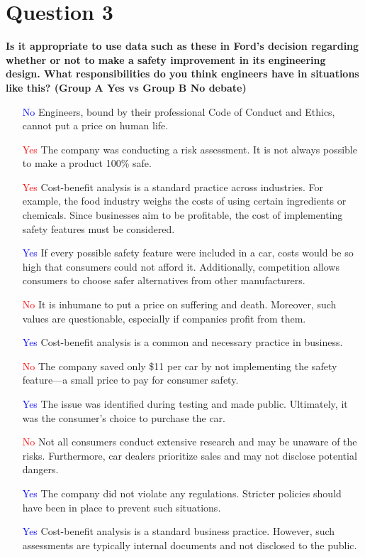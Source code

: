 \documentclass[12pt]{article}
\begin{document}
\section{Question 3}
\textbf{Is it appropriate to use data such as these in Ford’s decision regarding whether or not to make a safety improvement in its engineering design. What responsibilities do you think engineers have in situations like this?  (Group A Yes vs Group B No debate)}

\begin{itemize}
    \item [\textcolor{blue}{No}] Engineers, bound by their professional Code of Conduct and Ethics, cannot put a price on human life.
    \item [\textcolor{red}{Yes}] The company was conducting a risk assessment. It is not always possible to make a product 100\% safe.
    \item [\textcolor{red}{Yes}] Cost-benefit analysis is a standard practice across industries. For example, the food industry weighs the costs of using certain ingredients or chemicals. Since businesses aim to be profitable, the cost of implementing safety features must be considered.
    \item [\textcolor{blue}{Yes}] If every possible safety feature were included in a car, costs would be so high that consumers could not afford it. Additionally, competition allows consumers to choose safer alternatives from other manufacturers.
    \item [\textcolor{red}{No}] It is inhumane to put a price on suffering and death. Moreover, such values are questionable, especially if companies profit from them.
    \item [\textcolor{blue}{Yes}] Cost-benefit analysis is a common and necessary practice in business.
    \item [\textcolor{red}{No}] The company saved only \$11 per car by not implementing the safety feature—a small price to pay for consumer safety.
    \item [\textcolor{blue}{Yes}] The issue was identified during testing and made public. Ultimately, it was the consumer's choice to purchase the car.
    \item [\textcolor{red}{No}] Not all consumers conduct extensive research and may be unaware of the risks. Furthermore, car dealers prioritize sales and may not disclose potential dangers.
    \item [\textcolor{blue}{Yes}] The company did not violate any regulations. Stricter policies should have been in place to prevent such situations.
    \item [\textcolor{blue}{Yes}] Cost-benefit analysis is a standard business practice. However, such assessments are typically internal documents and not disclosed to the public.
\end{itemize}
\end{document}
